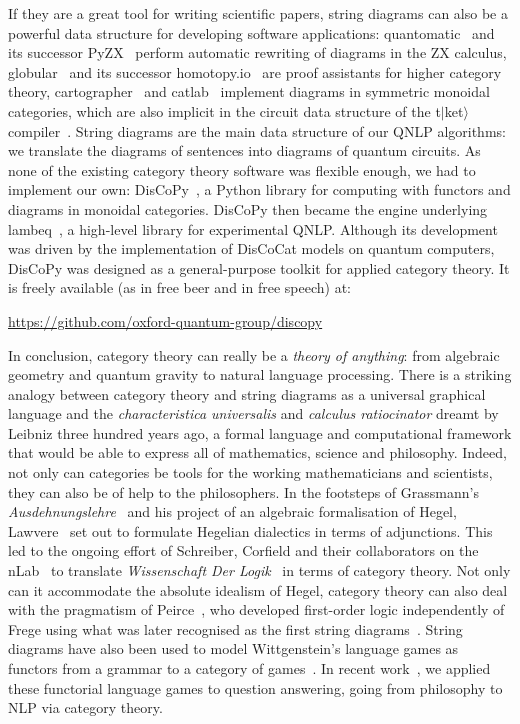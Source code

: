If they are a great tool for writing scientific papers, string diagrams can also be a powerful data structure for developing software applications:
quantomatic~\cite{KissingerZamdzhiev15} and its successor PyZX~\cite{KissingerVanDeWetering19} perform automatic rewriting of diagrams in the ZX calculus,
globular~\cite{BarEtAl18} and its successor homotopy.io~\cite{ReutterVicary19} are proof assistants for higher category theory,
cartographer~\cite{SobocinskiEtAl19} and catlab~\cite{PattersonEtAl21} implement diagrams in symmetric monoidal categories, which are also implicit in the circuit data structure of the t$|$ket$\rangle$ compiler~\cite{SivarajahEtAl20}.
String diagrams are the main data structure of our QNLP algorithms: we translate the diagrams of sentences into diagrams of quantum circuits.
As none of the existing category theory software was flexible enough, we had to implement our own: DisCoPy~\cite{FeliceEtAl20}, a Python library for computing with functors and diagrams in monoidal categories.
DisCoPy then became the engine underlying lambeq~\cite{KartsaklisEtAl21}, a high-level library for experimental QNLP.
Although its development was driven by the implementation of DisCoCat models on quantum computers, DisCoPy was designed as a general-purpose toolkit for applied category theory.
It is freely available (as in free beer and in free speech) at:

\url{https://github.com/oxford-quantum-group/discopy}

In conclusion, category theory can really be a \emph{theory of anything}: from algebraic geometry and quantum gravity to natural language processing.
There is a striking analogy between category theory and string diagrams as a universal graphical language and the \emph{characteristica universalis} and \emph{calculus ratiocinator} dreamt by Leibniz three hundred years ago, a formal language and computational framework that would be able to express all of mathematics, science and philosophy.
Indeed, not only can categories be tools for the working mathematicians and scientists, they can also be of help to the philosophers.
In the footsteps of Grassmann's \emph{Ausdehnungslehre}~\cite{Grassmann44} and his project of an algebraic formalisation of Hegel, Lawvere~\cite{Lawvere89,Lawvere91,Lawvere92,Lawvere96} set out to formulate Hegelian dialectics in terms of adjunctions.
This led to the ongoing effort of Schreiber, Corfield and their collaborators on the nLab~\cite{SchreiberEtAl21} to translate \emph{Wissenschaft Der Logik}~\cite{Hegel12} in terms of category theory.
Not only can it accommodate the absolute idealism of Hegel, category theory can also deal with the pragmatism of Peirce~\cite{Peirce06},
who developed first-order logic independently of Frege using what was later recognised as the first string diagrams~\cite{BradyTrimble98,BradyTrimble00,MelliesZeilberger16,HaydonSobocinski20}.
String diagrams have also been used to model Wittgenstein's language games as functors from a grammar to a category of games~\cite{HedgesLewis18}.
In recent work~\cite{FeliceEtAl20a}, we applied these functorial language games to question answering, going from philosophy to NLP via category theory.
